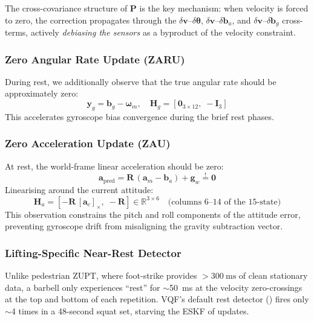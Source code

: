 The cross-covariance structure of $\mathbf{P}$ is the key mechanism: when velocity is forced to zero, the correction propagates through the $\delta\mathbf{v}$--$\delta\boldsymbol{\theta}$, $\delta\mathbf{v}$--$\delta\mathbf{b}_a$, and $\delta\mathbf{v}$--$\delta\mathbf{b}_g$ cross-terms, actively \emph{debiasing the sensors} as a byproduct of the velocity constraint.

\subsubsection{Zero Angular Rate Update (ZARU)}

During rest, we additionally observe that the true angular rate should be approximately zero:
\begin{equation}
  \mathbf{y}_g = \mathbf{b}_g - \boldsymbol{\omega}_m, \quad \mathbf{H}_g = [\mathbf{0}_{3\times12},\; -\mathbf{I}_3]
\end{equation}
This accelerates gyroscope bias convergence during the brief rest phases.

\subsubsection{Zero Acceleration Update (ZAU)}

At rest, the world-frame linear acceleration should be zero:
\begin{equation}
  \mathbf{a}_{\text{pred}} = \mathbf{R}\,(\mathbf{a}_m - \mathbf{b}_a) + \mathbf{g}_w \overset{!}{=} \mathbf{0}
\end{equation}
Linearising around the current attitude:
\begin{equation}
  \mathbf{H}_a = [-\mathbf{R}\,[\mathbf{a}_c]_\times,\; -\mathbf{R}] \in \mathbb{R}^{3\times6} \quad \text{(columns 6--14 of the 15-state)}
\end{equation}
This observation constrains the pitch and roll components of the attitude error, preventing gyroscope drift from misaligning the gravity subtraction vector.

\subsubsection{Lifting-Specific Near-Rest Detector}

Unlike pedestrian ZUPT, where foot-strike provides $>\SI{300}{\milli\second}$ of clean stationary data, a barbell only experiences ``rest'' for $\sim$\SI{50}{\milli\second} at the velocity zero-crossings at the top and bottom of each repetition.
VQF's default rest detector () fires only $\sim$4 times in a 48-second squat set, starving the ESKF of updates.

